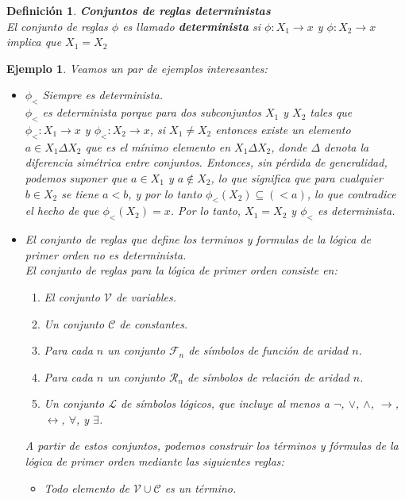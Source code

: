 \documentclass[executivepaper]{article}
\newtheorem{defi}[propo]{Definición}
\newtheorem{ejemplo}[propo]{Ejemplo}
\begin{document}
\begin{defi}\textbf{Conjuntos de reglas deterministas}\\
    El conjunto de reglas $\phi$ es llamado \textbf{determinista} si $\phi:X_1\rightarrow x$ y $\phi:X_2\rightarrow x$ implica que $X_1=X_2$
\end{defi}
\begin{ejemplo}
Veamos un par de ejemplos interesantes:
    \begin{itemize}
        \item $\phi_<$ Siempre es determinista.\\
        $\phi_< $ es determinista porque para dos subconjuntos $X_1$ y $X_2$ tales que $\phi_< : X_1\rightarrow x$ y $\phi_< : X_2\rightarrow x$, si $X_1 \neq X_2$ entonces existe un elemento $a \in X_1\Delta X_2$ que es el mínimo elemento en $X_1\Delta X_2$, donde $\Delta$ denota la diferencia simétrica entre conjuntos. Entonces, sin pérdida de generalidad, podemos suponer que $a\in X_1$ y $a\notin X_2$, lo que significa que para cualquier $b \in X_2$ se tiene $a<b$, y por lo tanto $\phi_<(X_2) \subseteq (<a)$, lo que contradice el hecho de que $\phi_<(X_2) = x$. Por lo tanto, $X_1 = X_2$ y $\phi_<$ es determinista.
        \item El conjunto de reglas que define los terminos y formulas de la lógica de primer orden no es determinista.\\
        El conjunto de reglas para la lógica de primer orden consiste en:
        \begin{enumerate}
            \item El conjunto $\mathcal{V}$ de variables.
            \item Un conjunto $\mathcal{C}$ de constantes.
            \item Para cada $n$ un conjunto $\mathcal{F}_n$ de símbolos de función de aridad $n$.
            \item Para cada $n$ un conjunto $\mathcal{R}_n$ de símbolos de relación de aridad $n$.
            \item Un conjunto $\mathcal{L}$ de símbolos lógicos, que incluye al menos a $\neg$, $\vee$, $\wedge$, $\rightarrow$, $\leftrightarrow$, $\forall$, y $\exists$.
        \end{enumerate}
        A partir de estos conjuntos, podemos construir los términos y fórmulas de la lógica de primer orden mediante las siguientes reglas:
        \begin{itemize}
            \item Todo elemento de $\mathcal{V} \cup \mathcal{C}$ es un término.

\end{itemize}
\end{itemize}
\end{ejemplo}
\end{document}
